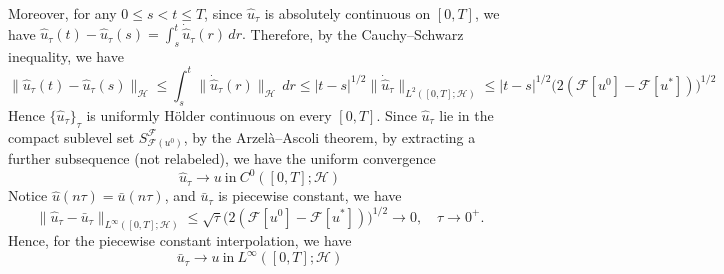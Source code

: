 \documentclass[10pt,a4paper]{amsart}
\newcommand{\calF}{\mathcal{F}}
\newcommand{\calH}{\mathcal{H}}
\renewenvironment{proof}{\par\noindent{\bf Proof\ }}{\hfill\BlackBoxProof\par\medskip}
\begin{document}
\begin{proof}
Moreover, for any $0\le s<t\le T$, since $\hat u_\tau$ is absolutely continuous on $[0,T]$, we have
\(
\hat u_\tau(t)-\hat u_\tau(s)=\int_s^t \dot{\hat u}_\tau(r)\,dr.
\)
Therefore, by the Cauchy--Schwarz inequality, we have
\[
\|\hat u_\tau(t)-\hat u_\tau(s)\|_{\mathcal H}
\le \int_s^t \|\dot{\hat u}_\tau(r)\|_{\mathcal H}\,dr
\le |t-s|^{1/2}\|\dot{\hat u}_\tau\|_{L^2([0,T];\mathcal H)} \le |t-s|^{1/2} \bigl(2(\mathcal F[u^0]-\calF[u^*])\bigr)^{1/2}
\]
Hence $\{\hat u_\tau\}_\tau$ is uniformly H\"older continuous on every $[0,T]$. Since $\hat{u}_{\tau}$ lie in the compact sublevel set $S_{\mathcal{F}(u^0)}^\calF$, by the Arzel\`a--Ascoli theorem, by extracting a further subsequence (not relabeled), we have the uniform convergence
\begin{equation}
 \hat{u}_{\tau} \rightarrow u ~\text{in}~ C^0([0, T]; \mathcal{H}) 
\end{equation}
Notice $\hat{u} (n \tau) = \bar{u} (n \tau)$, and $\bar{u}_{\tau}$ is piecewise constant, we have
\begin{equation}
 \| \hat{u}_{\tau} - \bar{u}_{\tau} \|_{L^{\infty} ([0, T]; \calH)} \leq \sqrt{\tau} \bigl(2(\mathcal F[u^0]-\calF[u^*])\bigr)^{1/2} \rightarrow 0, \quad \tau \rightarrow 0^+.
\end{equation}
Hence, for the piecewise constant interpolation, we have
\begin{equation}
  \bar{u}_{\tau} \rightarrow u ~\text{in}~ L^{\infty} ([0, T]; \mathcal{H})
\end{equation}


\end{proof}
\end{document}
